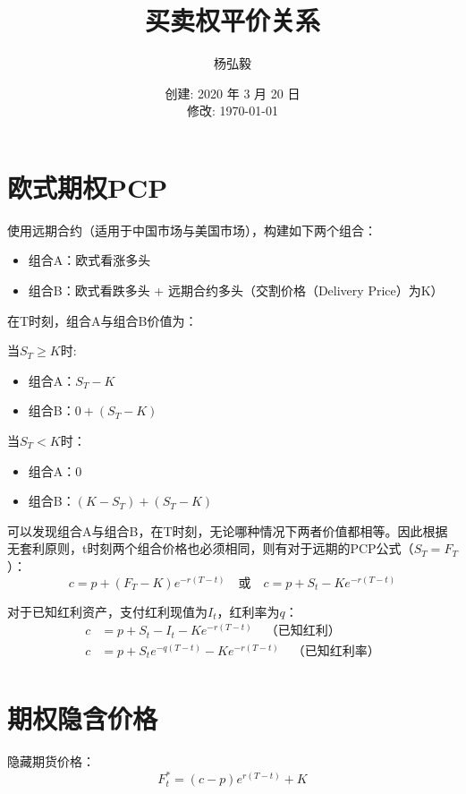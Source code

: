 \documentclass[11pt]{article}
\title{买卖权平价关系}
\author{杨弘毅}
\date{创建: 2020 年 3 月 20 日 \\修改: \today}
\begin{document}
\maketitle
\section{欧式期权PCP}
使用远期合约（适用于中国市场与美国市场），构建如下两个组合：

\begin{itemize}
\setlength{\itemindent}{2em}
    \item 组合A：欧式看涨多头
    \item 组合B：欧式看跌多头 + 远期合约多头（交割价格（Delivery Price）为K）
\end{itemize}

在T时刻，组合A与组合B价值为：
\begin{multicols}{2}
当$S_T \geq K$时:
\begin{itemize}
\setlength{\itemindent}{2em}
    \item 组合A：$S_T-K$
    \item 组合B：$0 + (S_T-K)$
\end{itemize}
\vfill\columnbreak
当$S_T < K$时：
\begin{itemize}
    \item 组合A：$0$
    \item 组合B：$(K - S_T) + (S_T-K)$
\end{itemize}
\end{multicols}

可以发现组合A与组合B，在T时刻，无论哪种情况下两者价值都相等。因此根据无套利原则，t时刻两个组合价格也必须相同，则有对于远期的PCP公式（$S_T=F_T$）：
\begin{equation*}
    c = p + (F_T-K)e^{-r(T-t)} \quad\text{或}\quad c = p + S_t - Ke^{-r(T-t)}
\end{equation*}

对于已知红利资产，支付红利现值为$I_t$，红利率为$q$：
\begin{align*}
    c &= p + S_t - I_t - Ke^{-r(T-t)} \quad \text{（已知红利）} \\
    c &= p + S_t e^{-q(T-t)} - Ke^{-r(T-t)}  \quad \text{（已知红利率）} \\
\end{align*}

\section{期权隐含价格}
隐藏期货价格：
\begin{equation*}
    F^*_t = (c-p)e^{r(T-t)} + K
\end{equation*}
\end{document}
